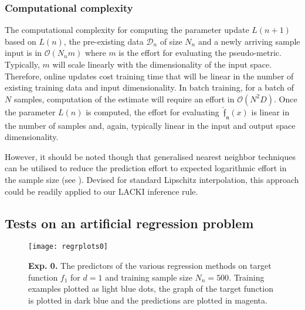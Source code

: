 \documentclass{article} %
\theoremstyle{definition}
\theoremstyle{remark}
\newcommand{\abs}[1]{\left\vert#1\right\vert}
\newcommand{\data}{\ensuremath{ \mathcal D} }
\newcommand{\inspace}{\ensuremath{ \mathcal X}}
\newcommand{\predfn}{\, \mathfrak{  \hat f_n}} %
\begin{document}
\subsubsection{Computational complexity}
The computational complexity for computing the parameter update $L(n+1)$ based on $L(n)$, the pre-existing data $\data_n$ of size $N_n$ and a newly arriving sample input is in $\mathcal O(N_n m) $ where $m$ is the effort for evaluating the pseudo-metric. Typically, $m$ will scale linearly with the dimensionality of the input space. Therefore, online updates cost training time that will be linear in the number of existing training data and input dimensionality. In batch training, for a batch of $N$ samples, computation of the estimate will require an effort in $\mathcal O(N^2 D)$. 
Once the parameter $L(n)$ is computed, the effort for evaluating $\predfn(x)$ is linear in the number of samples and, again, typically linear in the input and output space dimensionality. 

However, it should be noted though that generalised nearest neighbor techniques can be utilised to reduce the prediction effort to expected logarithmic effort in the sample size (see \cite{Beliakov2006}). Devised for standard Lipschitz interpolation, this approach could be readily applied to our LACKI inference rule.

\subsection{Tests on an artificial regression problem}
\label{sec:regr_benchmarks}
 \begin{figure*}
        \centering
		    \texttt{[image: regrplots0]}
   \caption{\textbf{Exp. 0.} The predictors of the various regression methods on target function $f_1$ for $d=1$ and training sample size $N_n = 500$. Training examples plotted as light blue dots, the graph of the target function is plotted in dark blue and the predictions are plotted in magenta.}
	 \label{fig:bench011dimregr}
\end{figure*}	   

\end{document}
